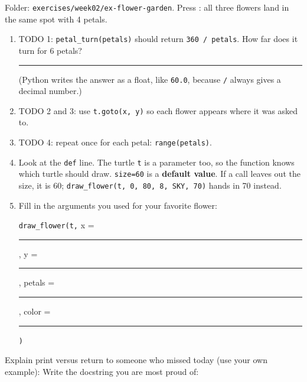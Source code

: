 \begin{exercise}
Folder: \texttt{exercises/week02/ex-flower-garden}. Press : all three flowers land in the same spot with 4 petals.
\begin{enumerate}[leftmargin=1.4em]
  \item TODO 1: \texttt{petal\_turn(petals)} should return \texttt{360 / petals}. How far does it turn for 6 petals? \rule{1.5cm}{0.4pt}\par
        (Python writes the answer as a float, like \texttt{60.0}, because \texttt{/} always gives a decimal number.)
  \item TODO 2 and 3: use \texttt{t.goto(x, y)} so each flower appears where it was asked to.
  \item TODO 4: repeat once for each petal: \texttt{range(petals)}.
  \item Look at the \texttt{def} line. The turtle \texttt{t} is a parameter too, so the function knows which turtle should draw.
        \texttt{size=60} is a \textbf{default value}. If a call leaves out the size, it is 60;
        \texttt{draw\_flower(t, 0, 80, 8, SKY, 70)} hands in 70 instead.
  \item Fill in the arguments you used for your favorite flower:\par
        \texttt{draw\_flower(t,} x = \rule{1.2cm}{0.4pt}, y = \rule{1.2cm}{0.4pt}, petals = \rule{1.2cm}{0.4pt}, color = \rule{2.2cm}{0.4pt}\texttt{)}
\end{enumerate}
\end{exercise}

\begin{vocab}
\end{vocab}

\begin{reflection}
Explain print versus return to someone who missed today (use your own example):
Write the docstring you are most proud of:
\end{reflection}
